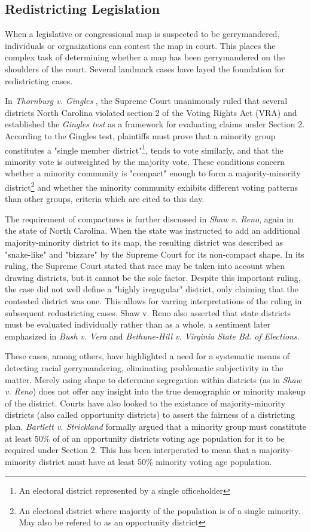 \documentclass{article}
\begin{document}
\subsection{Redistricting Legislation} \label{legislation}
When a legislative or congressional map is suspected to be gerrymandered, individuals or orgnaizations can contest the map in court. This places the complex task of determining whether a map has been gerrymandered on the shoulders of the court. Several landmark cases have layed the foundation for redistricting cases. 
\par
In \emph{Thornburg v. Gingles} \cite{ThorburgvGingles}, the Supreme Court unanimously ruled that several districts North Carolina violated section 2 of the Voting Rights Act (VRA) and established the \emph{Gingles test} as a framework for evaluating claims under Section 2. According to the Gingles test, plaintiffs must prove that a minority group constitutes a "single member district"\footnote{An electoral district represented by a single officeholder }, tends to vote similarly, and that the minority vote is outweighted by the majority vote. These conditions concern whether a minority community is "compact" enough to form a majority-minority district\footnote{An electoral district where majority of the population is of a single minority. May also be refered to as an opportunity district} and whether the minority community exhibits different voting patterns than other groups, criteria which are cited to this day.
\par 
The requirement of compactness is further discussed in \emph{Shaw v. Reno}\cite{ShawReno}, again in the state of North Carolina. When the state was instructed to add an additional majority-minority district to its map, the resulting district was described as "snake-like"  and "bizzare" by the Supreme Court for its non-compact shape. In its ruling, the Supreme Court stated that race may be taken into account when drawing districts, but it cannot be the sole factor. Despite this important ruling, the case did not well define a "highly iregugular" district, only claiming that the contested district was one. This allows for varring interpretations of the ruling in subsequent redustricting cases. Shaw v. Reno also asserted that state districts must be evaluated individually rather than as a whole, a sentiment later emphasized in \emph{Bush v. Vera}\cite{BushVera} and \emph{Bethune-Hill v. Virginia State Bd. of Elections}\cite{Bethune}.
\par
These cases, among others, have highlighted a need for a systematic means of detecting racial gerrymandering, eliminating problematic subjectivity in the matter. Merely using shape to determine segregation within districts (as in \emph{Shaw v. Reno}) does not offer any insight into the true demographic or minority makeup of the district. Courts have also looked to the existance of majority-minority districts (also called opportunity districts) to assert the fairness of a districting plan. \emph{Bartlett v. Strickland}\cite{Bartlett} formally argued that a minority group must constitute at least 50\% of of an opportunity districts voting age population for it to be required under Section 2. This has been interperated to mean that a majority-minority district must have at least 50\% minority voting age population. 
\end{document}
